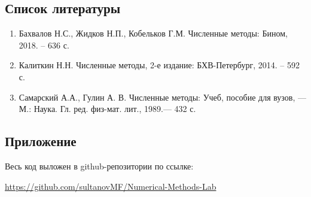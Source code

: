 \documentclass[a4paper, fontsize=14pt]{article}
\begin{document}
\subsection*{Список литературы}
\begin{enumerate}
    \item Бахвалов Н.С., Жидков Н.П., Кобельков Г.М. Численные методы: Бином, 2018. – 636 с. 
    \item Калиткин Н.Н. Численные методы, 2-е издание: БХВ-Петербург, 2014. – 592 с.
    \item Самарский А.А., Гулин А. В. Численные методы: Учеб, пособие для вузов, — М.: Наука. Гл. ред. физ-мат. лит., 1989.— 432 с.
\end{enumerate}
\newpage
\subsection*{Приложение}
Весь код выложен в github-репозитории по ссылке: 

\url{https://github.com/sultanovMF/Numerical-Methods-Lab}
\end{document}
